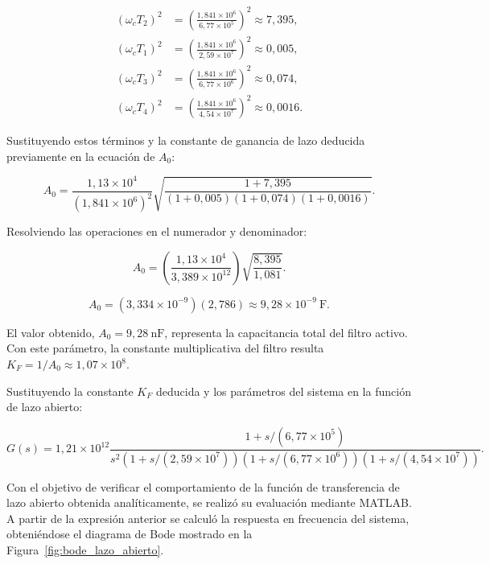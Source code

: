 \begin{align}
    (\omega_c T_2)^2 &= \left(\frac{1{,}841\times10^6}{6{,}77\times10^5}\right)^2 \approx 7{,}395, \\
    (\omega_c T_1)^2 &= \left(\frac{1{,}841\times10^6}{2{,}59\times10^7}\right)^2 \approx 0{,}005, \\
    (\omega_c T_3)^2 &= \left(\frac{1{,}841\times10^6}{6{,}77\times10^6}\right)^2 \approx 0{,}074, \\
    (\omega_c T_4)^2 &= \left(\frac{1{,}841\times10^6}{4{,}54\times10^7}\right)^2 \approx 0{,}0016.
\end{align}

Sustituyendo estos términos y la constante de ganancia de lazo deducida previamente en la ecuación de $A_0$:

\begin{equation}
A_0 = \frac{1{,}13\times10^4}{(1{,}841\times10^6)^2} \sqrt{\frac{1 + 7{,}395}{(1 + 0{,}005) (1 + 0{,}074) (1 + 0{,}0016)}}.
\end{equation}

Resolviendo las operaciones en el numerador y denominador:

\begin{equation}
A_0 = \left( \frac{1{,}13\times10^4}{3{,}389\times10^{12}} \right) \sqrt{\frac{8{,}395}{1{,}081}}.
\end{equation}

\begin{equation}
A_0 = (3{,}334\times10^{-9}) (2{,}786) \approx 9{,}28\times10^{-9}~\mathrm{F}.
\end{equation}

El valor obtenido, $A_0 = 9{,}28~\mathrm{nF}$, representa la capacitancia total del filtro activo. Con este parámetro, la constante multiplicativa del filtro resulta $K_F = 1/A_0 \approx 1{,}07\times10^8$.

Sustituyendo la constante $K_F$ deducida y los parámetros del sistema en la función de lazo abierto:

\begin{equation}
G(s) = 1{,}21\times10^{12} \frac{1 + s/(6{,}77\times10^5)}{s^2 \left(1 + s/(2{,}59\times10^7)\right) \left(1 + s/(6{,}77\times10^6)\right) \left(1 + s/(4{,}54\times10^7)\right)}.
\end{equation}

Con el objetivo de verificar el comportamiento de la función de transferencia de lazo abierto obtenida analíticamente, se realizó su evaluación mediante MATLAB. A partir de la expresión anterior se calculó la respuesta en frecuencia del sistema, obteniéndose el diagrama de Bode mostrado en la Figura~\ref{fig:bode_lazo_abierto}.

